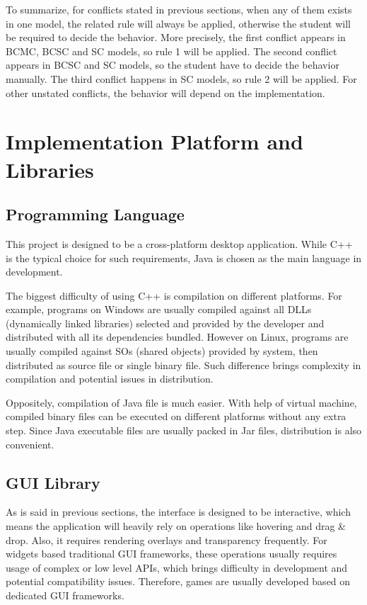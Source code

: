 \documentclass[msc,deptreport, cs]{infthesis}
\begin{document}
To summarize, for conflicts stated in previous sections, when any of them exists in one model, the related rule will always be applied, otherwise the student will be required to decide the behavior. More precisely, the first conflict appears in BCMC, BCSC and SC models, so rule 1 will be applied. The second conflict appears in BCSC and SC models, so the student have to decide the behavior manually. The third conflict happens in SC models, so rule 2 will be applied. For other unstated conflicts, the behavior will depend on the implementation.

\section{Implementation Platform and Libraries}

\subsection{Programming Language}

This project is designed to be a cross-platform desktop application. While C++ is the typical choice for such requirements, Java is chosen as the main language in development. 

The biggest difficulty of using C++ is compilation on different platforms. For example, programs on Windows are usually compiled against all DLLs (dynamically linked libraries) selected and provided by the developer and distributed with all its dependencies bundled. However on Linux, programs are usually compiled against SOs (shared objects) provided by system, then distributed as source file or single binary file. Such difference brings complexity in compilation and potential issues in distribution.

Oppositely, compilation of Java file is much easier. With help of virtual machine, compiled binary files can be executed on different platforms without any extra step. Since Java executable files are usually packed in Jar files, distribution is also convenient.

\subsection{GUI Library} \label{sec:opengl}

As is said in previous sections, the interface is designed to be interactive, which means the application will heavily rely on operations like hovering and drag \& drop. Also, it requires rendering overlays and transparency frequently. For widgets based traditional GUI frameworks, these operations usually requires usage of complex or low level APIs, which brings difficulty in development and potential compatibility issues. Therefore, games are usually developed based on dedicated GUI frameworks.
\end{document}
